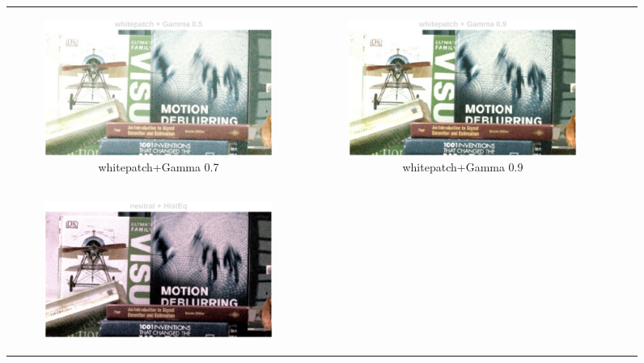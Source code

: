 \documentclass[11pt, a4]{article}
\begin{document}
\begin{enumerate}
\begin{enumerate}
\begin{figure}[h]
{\begin{tabular}{cccc}
\begin{subfigure}[h]{0.45\linewidth}
							\includegraphics[width=\linewidth]{../output/RawImage1_Tone_whitepatch_Gamma0.5.pdf}
							\caption{whitepatch+Gamma 0.7}
							\label{fig:RawImage1_tone_7}
						\end{subfigure} &
						\begin{subfigure}[h]{0.45\linewidth}
							\centering
							\includegraphics[width=\linewidth]{../output/RawImage1_Tone_whitepatch_Gamma0.9.pdf}
							\caption{whitepatch+Gamma 0.9}
							\label{fig:RawImage1_tone_8}
						\end{subfigure}\\
						\begin{subfigure}[h]{0.45\linewidth}
							\centering
							\includegraphics[width=\linewidth]{../output/RawImage1_Tone_neutral_HistEq.pdf}

\end{subfigure}
\end{tabular}}
\end{figure}
\end{enumerate}
\end{enumerate}
\end{document}
